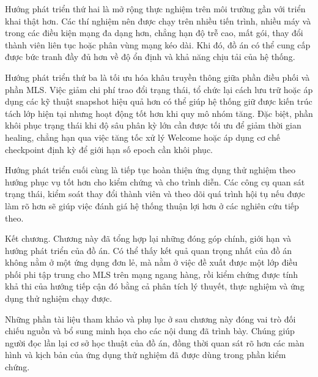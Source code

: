 \documentclass[../DoAn.tex]{subfiles}
\begin{document}
Hướng phát triển thứ hai là mở rộng thực nghiệm trên môi trường gần với triển khai thật hơn. Các thí nghiệm nên được chạy trên nhiều tiến trình, nhiều máy và trong các điều kiện mạng đa dạng hơn, chẳng hạn độ trễ cao, mất gói, thay đổi thành viên liên tục hoặc phân vùng mạng kéo dài. Khi đó, đồ án có thể cung cấp được bức tranh đầy đủ hơn về độ ổn định và khả năng chịu tải của hệ thống.

Hướng phát triển thứ ba là tối ưu hóa khâu truyền thông giữa phần điều phối và phần MLS. Việc giảm chi phí trao đổi trạng thái, tổ chức lại cách lưu trữ hoặc áp dụng các kỹ thuật snapshot hiệu quả hơn có thể giúp hệ thống giữ được kiến trúc tách lớp hiện tại nhưng hoạt động tốt hơn khi quy mô nhóm tăng. Đặc biệt, phần khôi phục trạng thái khi độ sâu phân kỳ lớn cần được tối ưu để giảm thời gian healing, chẳng hạn qua việc tăng tốc xử lý Welcome hoặc áp dụng cơ chế checkpoint định kỳ để giới hạn số epoch cần khôi phục.

Hướng phát triển cuối cùng là tiếp tục hoàn thiện ứng dụng thử nghiệm theo hướng phục vụ tốt hơn cho kiểm chứng và cho trình diễn. Các công cụ quan sát trạng thái, kiểm soát thay đổi thành viên và theo dõi quá trình hội tụ nếu được làm rõ hơn sẽ giúp việc đánh giá hệ thống thuận lợi hơn ở các nghiên cứu tiếp theo.

Kết chương. Chương này đã tổng hợp lại những đóng góp chính, giới hạn và hướng phát triển của đồ án. Có thể thấy kết quả quan trọng nhất của đồ án không nằm ở một ứng dụng đơn lẻ, mà nằm ở việc đề xuất được một lớp điều phối phi tập trung cho MLS trên mạng ngang hàng, rồi kiểm chứng được tính khả thi của hướng tiếp cận đó bằng cả phân tích lý thuyết, thực nghiệm và ứng dụng thử nghiệm chạy được.

Những phần tài liệu tham khảo và phụ lục ở sau chương này đóng vai trò đối chiếu nguồn và bổ sung minh họa cho các nội dung đã trình bày. Chúng giúp người đọc lần lại cơ sở học thuật của đồ án, đồng thời quan sát rõ hơn các màn hình và kịch bản của ứng dụng thử nghiệm đã được dùng trong phần kiểm chứng.
\end{document}
